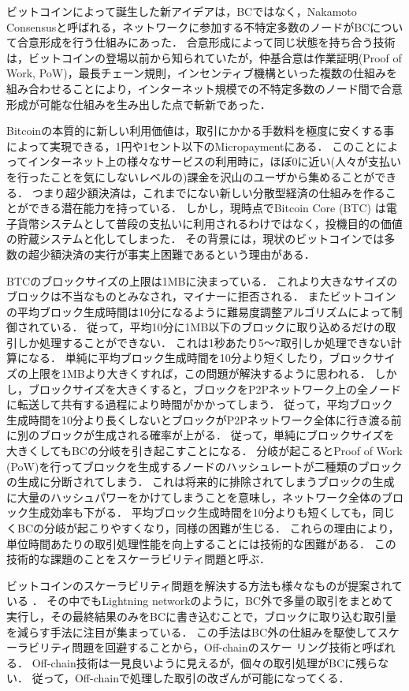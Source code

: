 \documentclass[graybox]{svmult}
\begin{document}
ビットコインによって誕生した新アイデアは，BCではなく，Nakamoto Consensusと呼ばれる，ネットワークに参加する不特定多数のノードがBCについて合意形成を行う仕組みにあった．
合意形成によって同じ状態を持ち合う技術は，ビットコインの登場以前から知られていたが，仲基合意は作業証明(Proof of Work, PoW)\cite{DN1993,JJ1999}，最長チェーン規則，インセンティブ機構といった複数の仕組みを組み合わせることにより，インターネット規模での不特定多数のノード間で合意形成が可能な仕組みを生み出した点で斬新であった．

Bitcoinの本質的に新しい利用価値は，取引にかかる手数料を極度に安くする事によって実現できる，1円や1セント以下のMicropaymentにある．
このことによってインターネット上の様々なサービスの利用時に，ほぼ0に近い(人々が支払いを行ったことを気にしないレベルの)課金を沢山のユーザから集めることができる．
つまり超少額決済は，これまでにない新しい分散型経済の仕組みを作ることができる潜在能力を持っている．
しかし，現時点でBitcoin Core (BTC) \cite{btc} は電子貨幣システムとして普段の支払いに利用されるわけではなく，投機目的の価値の貯蔵システムと化してしまった．
その背景には，現状のビットコインでは多数の超少額決済の実行が事実上困難であるという理由がある．

BTCのブロックサイズの上限は1MBに決まっている．
これより大きなサイズのブロックは不当なものとみなされ，マイナーに拒否される．
またビットコインの平均ブロック生成時間は10分になるように難易度調整アルゴリズムによって制御されている．
従って，平均10分に1MB以下のブロックに取り込めるだけの取引しか処理することができない．
これは1秒あたり5〜7取引しか処理できない計算になる．
単純に平均ブロック生成時間を10分より短くしたり，ブロックサイズの上限を1MBより大きくすれば，この問題が解決するように思われる．
しかし，ブロックサイズを大きくすると，ブロックをP2Pネットワーク上の全ノードに転送して共有する過程により時間がかかってしまう．
従って，平均ブロック生成時間を10分より長くしないとブロックがP2Pネットワーク全体に行き渡る前に別のブロックが生成される確率が上がる．
従って，単純にブロックサイズを大きくしてもBCの分岐を引き起こすことになる．
分岐が起こるとProof of Work (PoW)を行ってブロックを生成するノードのハッシュレートが二種類のブロックの生成に分断されてしまう．
これは将来的に排除されてしまうブロックの生成に大量のハッシュパワーをかけてしまうことを意味し，ネットワーク全体のブロック生成効率も下がる．
平均ブロック生成時間を10分よりも短くしても，同じくBCの分岐が起こりやすくなり，同様の困難が生じる．
これらの理由により，単位時間あたりの取引処理性能を向上することには技術的な困難がある．
この技術的な課題のことをスケーラビリティ問題と呼ぶ．


ビットコインのスケーラビリティ問題を解決する方法も様々なものが提案されている
\cite{ZHZB2020,Fujihara2018,Fujihara2019,Fujihara2020,YF2021a,YF2021b}．
その中でもLightning network\cite{PD2016}のように，BC外で多量の取引をまとめて実行し，その最終結果のみをBCに書き込むことで，ブロックに取り込む取引量を減らす手法に注目が集まっている．
この手法はBC外の仕組みを駆使してスケーラビリティ問題を回避することから，Off-chainのスケー
リング技術と呼ばれる．
Off-chain技術は一見良いように見えるが，個々の取引処理がBCに残らない．
従って，Off-chainで処理した取引の改ざんが可能になってくる．
\end{document}
